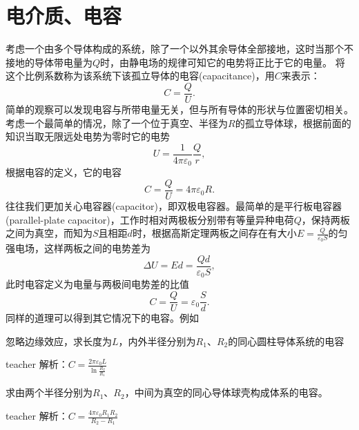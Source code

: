 \section{电介质、电容}

考虑一个由多个导体构成的系统，除了一个以外其余导体全部接地，这时当那个不接地的导体带电量为$Q$时，由静电场的规律可知它的电势将正比于它的电量。
将这个比例系数称为该系统下该孤立导体的{\heiti 电容}(capacitance)，用$C$来表示：
\begin{equation}
C = \frac{Q}{U}.
\end{equation}\label{eqn: static-elec-孤立导体的电容}
简单的观察可以发现电容与所带电量无关，但与所有导体的形状与位置密切相关。
考虑一个最简单的情况，除了一个位于真空、半径为$R$的孤立导体球，根据前面的知识当取无限远处电势为零时它的电势
\[
U = \frac{1}{4 \pi \varepsilon_0}\frac{Q}{r},
\]
根据电容的定义，它的电容
\begin{equation}
C = \frac{Q}{U} = 4 \pi \varepsilon_0 R.
\end{equation}
往往我们更加关心{\heiti 电容器}(capacitor)，即双极电容器。最简单的是{\heiti 平行板电容器}(parallel-plate capacitor)，工作时相对两极板分别带有等量异种电荷$Q$，保持两板之间为真空，而知为$S$且相距$d$时，根据高斯定理两板之间存在有大小$E = \frac{Q}{ \varepsilon_0 S}$的匀强电场，这样两板之间的电势差为
\[
\Delta U = E d = \frac{Qd}{ \varepsilon_0 S},
\]
此时电容定义为电量与两极间电势差的比值
\begin{equation}
C = \frac{Q}{U} = \varepsilon_0 \frac{S}{d}.
\end{equation}
同样的道理可以得到其它情况下的电容。例如


\begin{example}
忽略边缘效应，求长度为$L$，内外半径分别为$R_1$、$R_2$的同心圆柱导体系统的电容
\begin{taggedblock}{teacher}
\newline
解析：$C=\frac{2\pi\varepsilon_0L}{\ln\frac{R_2}{R_1}}$
\end{taggedblock}
\end{example}

\begin{example}
求由两个半径分别为$R_1$、$R_2$，中间为真空的同心导体球壳构成体系的电容。
\begin{taggedblock}{teacher}
\newline
解析：$C=\frac{4\pi\varepsilon_0R_1R_2}{R_2-R_1}$
\end{taggedblock}
\end{example}

